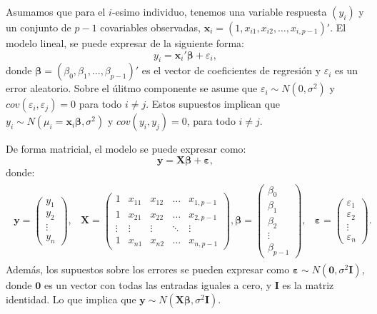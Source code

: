 \documentclass[
]{article}
\begin{document}
Asumamos que para el \(i\)-esimo individuo, tenemos una variable respuesta \((y_i)\) y un conjunto de \(p-1\) covariables observadas, \(\boldsymbol x_i = (1,x_{i1},x_{i2},\ldots,x_{i,p-1})'\). El modelo lineal, se puede expresar de la siguiente forma:
\[
y_i = \boldsymbol x_i'\boldsymbol \beta+ \varepsilon_i,
\]
donde \(\boldsymbol \beta=(\beta_0,\beta_1,\ldots,\beta_{p-1})'\) es el vector de coeficientes de regresión y \(\varepsilon_i\) es un error aleatorio. Sobre el úlitmo componente se asume que \(\varepsilon_i \sim N(0,\sigma^2)\) y \(cov(\varepsilon_i,\varepsilon_j) = 0\) para todo \(i\neq j\). Estos supuestos implican que \(y_i \sim N(\mu_i=\boldsymbol x_i\boldsymbol \beta,\sigma^2)\) y \(cov(y_i,y_j) = 0\), para todo \(i \neq j\).

De forma matricial, el modelo se puede expresar como:
\[
\boldsymbol y= \boldsymbol X\boldsymbol \beta+ \boldsymbol \varepsilon,
\]
donde:
\begin{gather}
\begin{aligned}
\boldsymbol y= \begin{pmatrix}
y_{1} \\ y_{2} \\ \vdots \\ y_{n}
\end{pmatrix}, & \boldsymbol X= \begin{pmatrix}
1 & x_{11} & x_{12} & \ldots & x_{1,p-1} \\ 1 & x_{21} & x_{22} & \ldots & x_{2,p-1} \\ \vdots & \vdots & \vdots & \ddots & \vdots \\ 1 & x_{n1} & x_{n2} & \ldots & x_{n,p-1}
\end{pmatrix},
\boldsymbol \beta= \begin{pmatrix}
\beta_{0} \\ \beta_{1} \\ \beta_{2} \\ \vdots \\ \beta_{p-1}
\end{pmatrix}, & \boldsymbol \varepsilon= \begin{pmatrix}
\varepsilon_{1} \\ \varepsilon_{2} \\ \vdots \\ \varepsilon_{n}
\end{pmatrix}.
\end{aligned}
\nonumber
\end{gather}
Además, los supuestos sobre los errores se pueden expresar como \(\boldsymbol \varepsilon\sim N(\boldsymbol 0, \sigma^{2}\boldsymbol I)\), donde \(\boldsymbol 0\) es un vector con todas las entradas iguales a cero, y \(\boldsymbol I\) es la matriz identidad. Lo que implica que \(\boldsymbol y\sim N(\boldsymbol X\boldsymbol \beta, \sigma^2\boldsymbol I)\).
\end{document}
